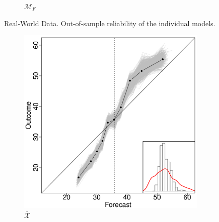 \documentclass[11pt]{article}
\theoremstyle{definition}
\theoremstyle{definition}
\begin{document}
\begin{figure}[H]
\begin{subfigure}[b]{0.241\textwidth}
                \caption{$\mathcal{M}_F$}
                \label{RelDiagramNoF}
        \end{subfigure}           
          \caption{Real-World Data. Out-of-sample reliability of the individual models.}
                \label{RelDiagramMo}
\end{figure}
\begin{figure}[H]
        \centering
 
        \begin{subfigure}[b]{0.323\textwidth}
                \includegraphics[width=\textwidth]{IndependentELP.pdf}
                \caption{$\bar{\mathcal{X}}$}
                \label{fig:mouse}
        \end{subfigure}
                  \begin{subfigure}[b]{0.323\textwidth}

\end{subfigure}
\end{figure}
\end{document}
